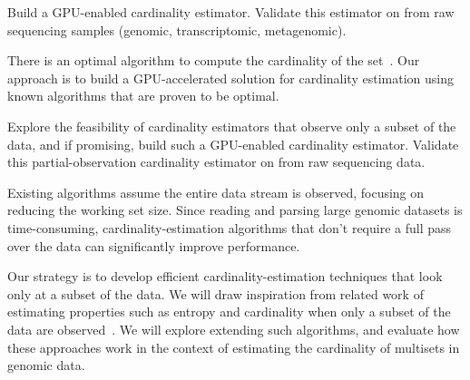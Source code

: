 \begin{rproblem}
Build a GPU-enabled cardinality estimator. Validate this estimator on \kmers from raw sequencing samples (genomic, transcriptomic, metagenomic).
\end{rproblem}

There is an optimal algorithm to compute the cardinality of the set~\cite{Kane2010}.
Our approach is to build a GPU-accelerated solution for cardinality estimation using known algorithms that are proven to be optimal.

\begin{rproblem}
Explore the feasibility of cardinality estimators that observe only a  subset of the data, and if promising, build such a GPU-enabled cardinality estimator. Validate this partial-observation cardinality estimator on \kmers from raw sequencing data.
\end{rproblem}

Existing algorithms assume the entire data stream is observed, focusing on reducing the working set size. Since reading and parsing large genomic datasets is time-consuming, cardinality-estimation algorithms that don't require a full pass over the data can significantly improve performance.



Our strategy is to develop efficient cardinality-estimation techniques that look only at a subset of the data. 
We will draw inspiration from related work of estimating properties such as entropy and cardinality when only a subset of the data are observed~\cite{valiant2017estimating}.  We will explore extending such algorithms, and evaluate how these approaches work in the context of estimating the cardinality of \kmer multisets in genomic data.  
